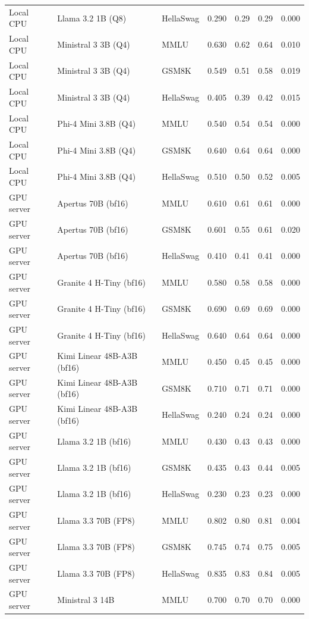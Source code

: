 \begin{longtable}{@{}l l l r r r r@{}}
Local CPU & Llama 3.2 1B (Q8) & HellaSwag & 0.290 & 0.29 & 0.29 & 0.000 \\
Local CPU & Ministral 3 3B (Q4) & MMLU & 0.630 & 0.62 & 0.64 & 0.010 \\
Local CPU & Ministral 3 3B (Q4) & GSM8K & 0.549 & 0.51 & 0.58 & 0.019 \\
Local CPU & Ministral 3 3B (Q4) & HellaSwag & 0.405 & 0.39 & 0.42 & 0.015 \\
Local CPU & Phi-4 Mini 3.8B (Q4) & MMLU & 0.540 & 0.54 & 0.54 & 0.000 \\
Local CPU & Phi-4 Mini 3.8B (Q4) & GSM8K & 0.640 & 0.64 & 0.64 & 0.000 \\
Local CPU & Phi-4 Mini 3.8B (Q4) & HellaSwag & 0.510 & 0.50 & 0.52 & 0.005 \\
\midrule
GPU server & Apertus 70B (bf16) & MMLU & 0.610 & 0.61 & 0.61 & 0.000 \\
GPU server & Apertus 70B (bf16) & GSM8K & 0.601 & 0.55 & 0.61 & 0.020 \\
GPU server & Apertus 70B (bf16) & HellaSwag & 0.410 & 0.41 & 0.41 & 0.000 \\
GPU server & Granite 4 H-Tiny (bf16) & MMLU & 0.580 & 0.58 & 0.58 & 0.000 \\
GPU server & Granite 4 H-Tiny (bf16) & GSM8K & 0.690 & 0.69 & 0.69 & 0.000 \\
GPU server & Granite 4 H-Tiny (bf16) & HellaSwag & 0.640 & 0.64 & 0.64 & 0.000 \\
GPU server & Kimi Linear 48B-A3B (bf16) & MMLU & 0.450 & 0.45 & 0.45 & 0.000 \\
GPU server & Kimi Linear 48B-A3B (bf16) & GSM8K & 0.710 & 0.71 & 0.71 & 0.000 \\
GPU server & Kimi Linear 48B-A3B (bf16) & HellaSwag & 0.240 & 0.24 & 0.24 & 0.000 \\
GPU server & Llama 3.2 1B (bf16) & MMLU & 0.430 & 0.43 & 0.43 & 0.000 \\
GPU server & Llama 3.2 1B (bf16) & GSM8K & 0.435 & 0.43 & 0.44 & 0.005 \\
GPU server & Llama 3.2 1B (bf16) & HellaSwag & 0.230 & 0.23 & 0.23 & 0.000 \\
GPU server & Llama 3.3 70B (FP8) & MMLU & 0.802 & 0.80 & 0.81 & 0.004 \\
GPU server & Llama 3.3 70B (FP8) & GSM8K & 0.745 & 0.74 & 0.75 & 0.005 \\
GPU server & Llama 3.3 70B (FP8) & HellaSwag & 0.835 & 0.83 & 0.84 & 0.005 \\
GPU server & Ministral 3 14B & MMLU & 0.700 & 0.70 & 0.70 & 0.000 \\

\end{longtable}

